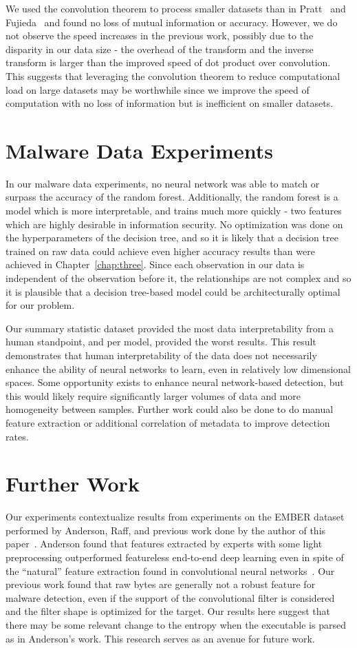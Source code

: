 We used the convolution theorem to process smaller datasets than in Pratt~\cite{pratt2017fcnn} and Fujieda~\cite{fujieda2017wavelet} and found no loss of mutual information or accuracy.
However, we do not observe the speed increases in the previous work, possibly due to the disparity in our data size - the overhead of the transform and the inverse transform is larger than the improved speed of dot product over convolution.
This suggests that leveraging the convolution theorem to reduce computational load on large datasets may be worthwhile since we improve the speed of computation with no loss of information but is inefficient on smaller datasets.

\section{Malware Data Experiments}
In our malware data experiments, no neural network was able to match or surpass the accuracy of the random forest.
Additionally, the random forest is a model which is more interpretable, and trains much more quickly - two features which are highly desirable in information security.
No optimization was done on the hyperparameters of the decision tree, and so it is likely that a decision tree trained on raw data could achieve even higher accuracy results than were achieved in Chapter~\ref{chap:three}. 
Since each observation in our data is independent of the observation before it, the relationships are not complex and so it is plausible that a decision tree-based model could be architecturally optimal for our problem.

Our summary statistic dataset provided the most data interpretability from a human standpoint, and per model, provided the worst results. 
This result demonstrates that human interpretability of the data does not necessarily enhance the ability of neural networks to learn, even in relatively low dimensional spaces.
Some opportunity exists to enhance neural network-based detection, but this would likely require significantly larger volumes of data and more homogeneity between samples.
Further work could also be done to do manual feature extraction or additional correlation of metadata to improve detection rates.

\section{Further Work}
Our experiments contextualize results from experiments on the EMBER dataset performed by Anderson, Raff, and previous work done by the author of this paper~\cite{anderson2018ember, raff2018malware, galinkin2019shape}.
Anderson found that features extracted by experts with some light preprocessing outperformed featureless end-to-end deep learning even in spite of the ``natural'' feature extraction found in convolutional neural networks~\cite{he2016deep}.
Our previous work found that raw bytes are generally not a robust feature for malware detection, even if the support of the convolutional filter is considered and the filter shape is optimized for the target.
Our results here suggest that there may be some relevant change to the entropy when the executable is parsed as in Anderson's work.
This research serves as an avenue for future work.

